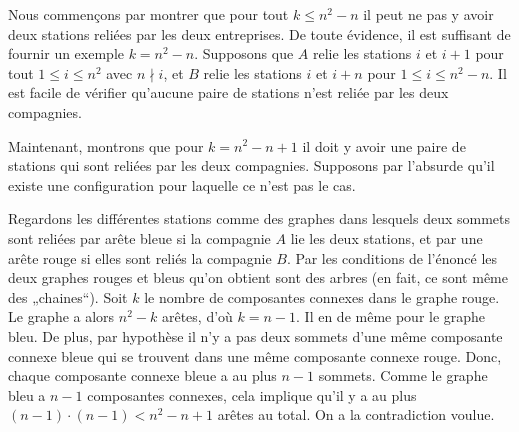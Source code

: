 \begin{sol}
Nous commençons par montrer que pour tout $k \le n^2 - n$ il peut ne pas y avoir deux stations reliées par les deux entreprises. De toute évidence, il est suffisant de fournir un exemple $k =n^2 - n$.
Supposons que $ A$ relie les stations $i$ et $i+1$ pour tout $1 \le i \le n^2$ avec $n\nmid i$, et $B$ relie les stations $i$ et $i+n$ pour $1 \le i \le n^2 - n$.
 Il est facile de vérifier qu’aucune paire de stations n’est reliée par les deux compagnies.

Maintenant, montrons que pour $k=n^2-n+1$ il doit y avoir une paire de stations qui sont reliées par les deux compagnies.
Supposons par l’absurde qu’il existe une configuration pour laquelle ce n’est pas le cas.

Regardons les différentes stations comme des graphes dans lesquels deux sommets sont reliées par arête bleue si la compagnie $A$ lie les deux stations, et par une arête rouge si elles sont reliés la compagnie $B$. Par les conditions de l’énoncé les deux graphes rouges et bleus qu’on obtient sont des arbres (en fait, ce sont même des „chaines“). Soit $k$ le nombre de composantes connexes dans le graphe rouge. Le graphe a alors $n^2-k $ arêtes, d’où $k = n-1$. Il en de même pour le graphe bleu. De plus, par hypothèse il n’y a pas deux sommets d’une même composante connexe bleue qui se trouvent dans une même composante connexe rouge. Donc, chaque composante connexe bleue a au plus $n-1$ sommets. Comme le graphe bleu a $n-1$ composantes connexes, cela implique qu’il y a au plus $(n-1) \cdot (n-1) < n^2-n + 1$ arêtes au total. On a la contradiction voulue.
\end{sol}



